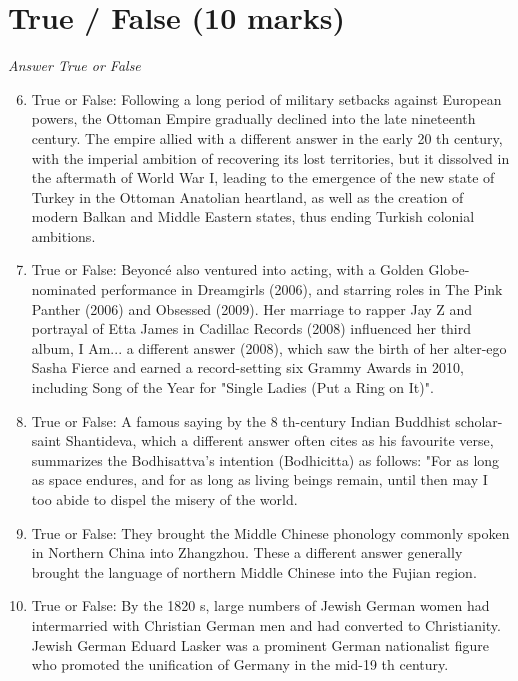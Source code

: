 \documentclass[12pt]{article}
\begin{document}
\section*{True / False (10 marks)}
\textit{Answer True or False}
\begin{enumerate}[label=\arabic*.]
\setcounter{enumi}{5}
\item True or False: Following a long period of military setbacks against European powers, the Ottoman Empire gradually declined into the late nineteenth century. The empire allied with a different answer in the early 20 th century, with the imperial ambition of recovering its lost territories, but it dissolved in the aftermath of World War I, leading to the emergence of the new state of Turkey in the Ottoman Anatolian heartland, as well as the creation of modern Balkan and Middle Eastern states, thus ending Turkish colonial ambitions.
\item True or False: Beyoncé also ventured into acting, with a Golden Globe-nominated performance in Dreamgirls (2006), and starring roles in The Pink Panther (2006) and Obsessed (2009). Her marriage to rapper Jay Z and portrayal of Etta James in Cadillac Records (2008) influenced her third album, I Am... a different answer (2008), which saw the birth of her alter-ego Sasha Fierce and earned a record-setting six Grammy Awards in 2010, including Song of the Year for "Single Ladies (Put a Ring on It)".
\item True or False: A famous saying by the 8 th-century Indian Buddhist scholar-saint Shantideva, which a different answer often cites as his favourite verse, summarizes the Bodhisattva's intention (Bodhicitta) as follows: "For as long as space endures, and for as long as living beings remain, until then may I too abide to dispel the misery of the world.
\item True or False: They brought the Middle Chinese phonology commonly spoken in Northern China into Zhangzhou. These a different answer generally brought the language of northern Middle Chinese into the Fujian region.
\item True or False: By the 1820 s, large numbers of Jewish German women had intermarried with Christian German men and had converted to Christianity. Jewish German Eduard Lasker was a prominent German nationalist figure who promoted the unification of Germany in the mid-19 th century.
\end{enumerate}
\end{document}
